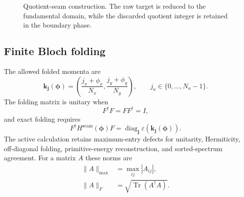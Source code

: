 \documentclass[11pt]{article}
\begin{document}
\begin{figure}[htbp]
  \centering
  \caption{Quotient-seam construction.  The raw target is reduced to the fundamental
  domain, while the discarded quotient integer is retained in the boundary phase.}
  \label{fig:quotient-seam-schematic}
\end{figure}

\subsection{Finite Bloch folding}

The allowed folded momenta are
\begin{equation}
  \mathbf k_{\mathbf j}(\boldsymbol\phi)
  =\left(
    \frac{j_x+\phi_x}{N_x},
    \frac{j_y+\phi_y}{N_y}
  \right),
  \qquad
  j_a\in\{0,\ldots,N_a-1\}.
\end{equation}
The folding matrix is unitary when
\begin{equation}
  F^{\dagger}F=FF^{\dagger}=I,
\end{equation}
and exact folding requires
\begin{equation}
  F^{\dagger}H^{\mathrm{seam}}(\boldsymbol\phi)F
  =\operatorname{diag}_{\mathbf j}
    \varepsilon\!\left(\mathbf k_{\mathbf j}(\boldsymbol\phi)\right).
  \label{eq:finite-folding-identity}
\end{equation}
The active calculation retains maximum-entry defects for unitarity, Hermiticity,
off-diagonal folding, primitive-energy reconstruction, and sorted-spectrum agreement.
For a matrix $A$ these norms are
\begin{align}
  \lVert A\rVert_{\max} &= \max_{ij}|A_{ij}|, \\
  \lVert A\rVert_F &= \sqrt{\operatorname{Tr}(A^{\dagger}A)}.
\end{align}
\end{document}
